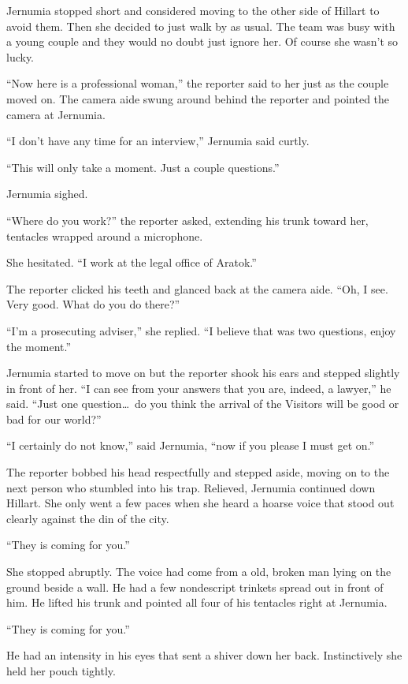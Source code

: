 Jernumia stopped short and considered moving to the other side of Hillart to avoid them. Then
she decided to just walk by as usual. The team was busy with a young couple and they would no
doubt just ignore her. Of course she wasn't so lucky.

``Now here is a professional woman,'' the reporter said to her just as the couple moved on. The
camera aide swung around behind the reporter and pointed the camera at Jernumia.

``I don't have any time for an interview,'' Jernumia said curtly.

``This will only take a moment. Just a couple questions.''

Jernumia sighed.

``Where do you work?'' the reporter asked, extending his trunk toward her, tentacles wrapped
around a microphone.

She hesitated. ``I work at the legal office of Aratok.''

The reporter clicked his teeth and glanced back at the camera aide. ``Oh, I see. Very good. What
do you do there?''

``I'm a prosecuting adviser,'' she replied. ``I believe that was two questions, enjoy the
moment.''

Jernumia started to move on but the reporter shook his ears and stepped slightly in front of
her. ``I can see from your answers that you are, indeed, a lawyer,'' he said. ``Just one
question\ldots\ do you think the arrival of the Visitors will be good or bad for our world?''

``I certainly do not know,'' said Jernumia, ``now if you please I must get on.''

The reporter bobbed his head respectfully and stepped aside, moving on to the next person who
stumbled into his trap. Relieved, Jernumia continued down Hillart. She only went a few paces
when she heard a hoarse voice that stood out clearly against the din of the city.

``They is coming for you.''

She stopped abruptly. The voice had come from a old, broken man lying on the ground beside a
wall. He had a few nondescript trinkets spread out in front of him. He lifted his trunk and
pointed all four of his tentacles right at Jernumia.

``They is coming for you.''

He had an intensity in his eyes that sent a shiver down her back. Instinctively she held her
pouch tightly.

